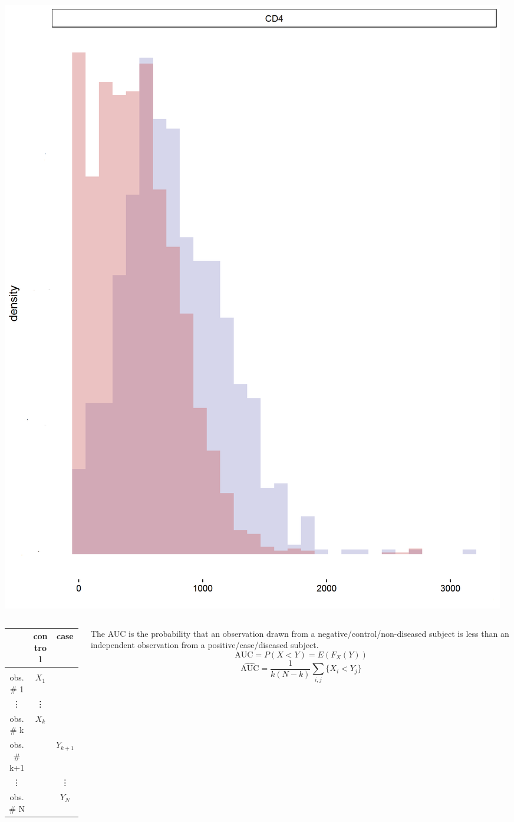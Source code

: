 \documentclass{beamer}
\newcommand{\E}{E}
\renewcommand{\P}{P}
\newcommand{\I}{N}
\begin{document}
\begin{frame}
  \centering
  \includegraphics[scale=.25]{fig4.png}
\end{frame}
\begin{frame}
  \begin{columns}
    \begin{column}{.5\textwidth}
  \begin{tabular}{c | c | c}
    & control & case\\
    \hline&&\\
    obs. \# 1 & $X_1$ & \\
    \vdots & \vdots & \\
    obs. \# k & $X_{k}$ &\\
      obs. \# k+1 &  & $Y_{k+1}$\\
     \vdots & & \vdots\\
    obs. \# \I &  & $Y_{\I}$\\
  \end{tabular}
\end{column}
\begin{column}{.5\textwidth}
  The AUC is the probability that an observation drawn from a
  negative/control/non-diseased subject is less than an independent
  observation from a positive/case/diseased subject.
  $$\text{AUC}=\P(X < Y)=\E(F_X(Y))$$
  $$\widehat{\text{AUC}}=\frac{1}{k(\I-k)}\sum_{i,j}\{X_i<Y_j\}$$
\end{column}
\end{columns}
\end{frame}
\end{document}
